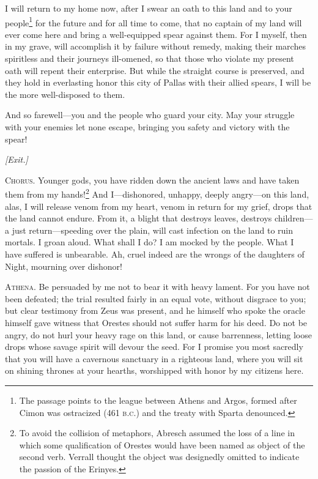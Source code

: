 \documentclass[12pt]{article}
\begin{document}
I will return to my home now, after I swear an oath to this land and to your people\footnote{The passage points to the league between Athens and Argos, formed after Cimon was ostracized (461 \textsc{b.c.}) and the treaty with Sparta denounced.} for the future and for all time to come, that no captain of my land will ever come here and bring a well-equipped spear against them. For I myself, then in my grave, will accomplish it by failure without remedy, making their marches spiritless and their journeys ill-omened, so that those who violate my present oath will repent their enterprise. But while the straight course is preserved, and they hold in everlasting honor this city of Pallas with their allied spears, I will be the more well-disposed to them.

And so farewell---you and the people who guard your city. May your struggle with your enemies let none escape, bringing you safety and victory with the spear!

\begin{center}
\textit{[Exit.]}
\end{center}

\textsc{Chorus.} Younger gods, you have ridden down the ancient laws and have taken them from my hands!\footnote{To avoid the collision of metaphors, Abresch assumed the loss of a line in which some qualification of Orestes would have been named as object of the second verb. Verrall thought the object was designedly omitted to indicate the passion of the Erinyes.} And I---dishonored, unhappy, deeply angry---on this land, alas, I will release venom from my heart, venom in return for my grief, drops that the land cannot endure. From it, a blight that destroys leaves, destroys children---a just return---speeding over the plain, will cast infection on the land to ruin mortals. I groan aloud. What shall I do? I am mocked by the people. What I have suffered is unbearable. Ah, cruel indeed are the wrongs of the daughters of Night, mourning over dishonor!

\textsc{Athena.} Be persuaded by me not to bear it with heavy lament. For you have not been defeated; the trial resulted fairly in an equal vote, without disgrace to you; but clear testimony from Zeus was present, and he himself who spoke the oracle himself gave witness that Orestes should not suffer harm for his deed. Do not be angry, do not hurl your heavy rage on this land, or cause barrenness, letting loose drops whose savage spirit will devour the seed. For I promise you most sacredly that you will have a cavernous sanctuary in a righteous land, where you will sit on shining thrones at your hearths, worshipped with honor by my citizens here.
\end{document}
